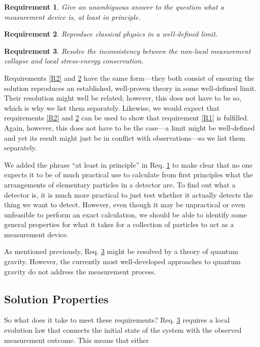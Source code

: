 \documentclass[superscriptaddress,floatfix,nofootinbib,12pt]{revtex4-2}
\newtheorem{requirement}{Requirement}
\begin{document}
\begin{requirement}\label{R3}
  Give an unambiguous answer to the question what a measurement device is, at least in principle.
\end{requirement}

\begin{requirement}\label{R4}
  Reproduce classical physics in a well-defined limit.
\end{requirement}

\begin{requirement}\label{R5}
  Resolve the inconsistency between the non-local measurement collapse and local stress-energy conservation.
\end{requirement}

Requirements \ref{R2} and \ref{R4} have the same form---they both consist of ensuring the solution reproduces an established, well-proven theory in some well-defined limit. Their resolution might well be related; however, this does not have to be so, which is why we list them separately. Likewise, we would expect that requirements \ref{R2} and \ref{R4} can be used to show that requirement \ref{R1} is fulfilled. Again, however, this does not have to be the case---a limit might be well-defined and yet its result might just be in conflict with observations---so we list them separately. 

We added the phrase ``at least in principle'' in Req. \ref{R3} to make clear that no one expects it to be of much practical use to calculate from first principles what the arrangements of elementary particles in a detector are. To find out what a detector is, it is much more practical to just test whether it actually detects the thing we want to detect. However, even though it may be unpractical or even unfeasible to perform an exact calculation, we should be able to identify some general properties for what it takes for a collection of particles to act as a measurement device.

As mentioned previously, Req. \ref{R5} might be resolved by a theory of quantum gravity. However, the currently most well-developed approaches to quantum gravity do not address the measurement process. 

\subsection{Solution Properties}

So what does it take to meet these requirements? Req. \ref{R5} requires a local evolution law that connects the initial state of the system with the observed measurement outcome. This means that either
 
\end{document}

